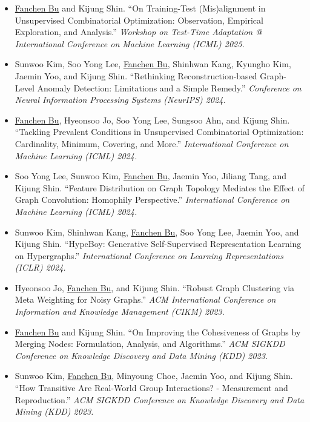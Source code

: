 \documentclass{resume}
\begin{document}
\begin{itemize}[parsep=0.5ex]
  \item [{[W1]}]
  \underline{Fanchen Bu} and Kijung Shin.
  ``On Training-Test (Mis)alignment in Unsupervised Combinatorial Optimization: Observation, Empirical Exploration, and Analysis.''
  \textit{Workshop on Test-Time Adaptation @ International Conference on Machine Learning (ICML) 2025.}

  \item [{[C11]}]
  Sunwoo Kim, Soo Yong Lee, \underline{Fanchen Bu}, Shinhwan Kang, Kyungho Kim, Jaemin Yoo, and Kijung Shin.
  ``Rethinking Reconstruction-based Graph-Level Anomaly Detection: Limitations and a Simple Remedy.''
  \textit{Conference on Neural Information Processing Systems (NeurIPS) 2024.}
  
  \item [{[C10]}]
  \underline{Fanchen Bu}, Hyeonsoo Jo, Soo Yong Lee, Sungsoo Ahn, and Kijung Shin.
  ``Tackling Prevalent Conditions in Unsupervised Combinatorial Optimization: Cardinality, Minimum, Covering, and More.''
  \textit{International Conference on Machine Learning (ICML) 2024.}
  
  \item [{[C9]}]
  Soo Yong Lee, Sunwoo Kim, \underline{Fanchen Bu}, Jaemin Yoo, Jiliang Tang, and Kijung Shin.
  ``Feature Distribution on Graph Topology Mediates the Effect of Graph Convolution: Homophily Perspective.''
  \textit{International Conference on Machine Learning (ICML) 2024.}

  \item [{[C8]}]
  Sunwoo Kim, Shinhwan Kang, \underline{Fanchen Bu}, Soo Yong Lee, Jaemin Yoo, and Kijung Shin.
  ``HypeBoy: Generative Self-Supervised Representation Learning on Hypergraphs.''
  \textit{International Conference on Learning Representations (ICLR) 2024.}
  
  \item [{[C7]}]
  Hyeonsoo Jo, \underline{Fanchen Bu}, and Kijung Shin.
  ``Robust Graph Clustering via Meta Weighting for Noisy Graphs.''
  \textit{ACM International Conference on Information and Knowledge Management (CIKM) 2023.}
  
  \item [{[C6]}]
  \underline{Fanchen Bu} and Kijung Shin.
  ``On Improving the Cohesiveness of Graphs by Merging Nodes: Formulation, Analysis, and Algorithms.''
  \textit{ACM SIGKDD Conference on Knowledge Discovery and Data Mining (KDD) 2023.}
  
  \item [{[C5]}]
  Sunwoo Kim, \underline{Fanchen Bu}, Minyoung Choe, Jaemin Yoo, and Kijung Shin.
  ``How Transitive Are Real-World Group Interactions? - Measurement and Reproduction.''
  \textit{ACM SIGKDD Conference on Knowledge Discovery and Data Mining (KDD) 2023.}


\end{itemize}
\end{document}
